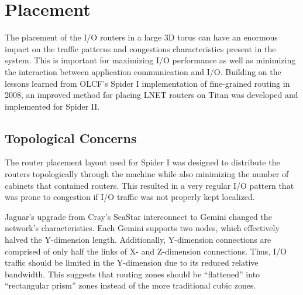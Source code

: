 \section{Placement}

The placement of the I/O routers in a large 3D torus can have an enormous impact
on the traffic patterns and congestions characteristics present in the system.
This is important for maximizing I/O performance as well as minimizing the
interaction between application communication and I/O. Building on the lessons
learned from OLCF's Spider I implementation of fine-grained routing in 2008, an
improved method for placing LNET routers on Titan was developed and implemented
for Spider II.

\subsection{Topological Concerns}

The router placement layout used for Spider I was designed to distribute the
routers topologically through the machine while also minimizing the number of
cabinets that contained routers. This resulted in a very regular I/O pattern
that was prone to congestion if I/O traffic was not properly kept localized.

Jaguar's upgrade from Cray's SeaStar interconnect to Gemini changed the
network's characteristics.  Each Gemini supports two nodes, which effectively
halved the Y-dimension length.  Additionally, Y-dimension connections are
comprised of only half the links of X- and Z-dimension connections.  Thus, I/O
traffic should be limited in the Y-dimension due to its reduced relative
bandwidth. This suggests that routing zones should be ``flattened'' into
``rectangular prism'' zones instead of the more traditional cubic zones.

